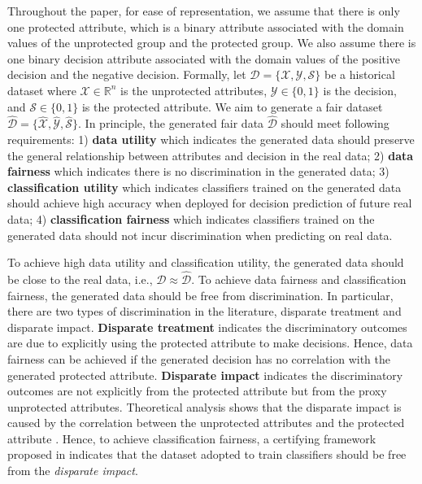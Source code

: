 \documentclass[sigconf]{acmart}
\theoremstyle{definition}
\begin{document}
Throughout the paper, for ease of representation, we assume that there is only one protected attribute,  which is a binary attribute associated with the domain values of the unprotected group  and the protected group. We also assume there is one binary decision attribute associated with the domain values of the positive decision and the negative decision. Formally, let $\mathcal{D} = \{\mathcal{X}, \mathcal{Y}, \mathcal{S}\}$ be a historical dataset where $\mathcal{X} \in \mathbb{R}^n$ is the unprotected attributes, $\mathcal{Y} \in \{0,1\}$ is the decision, and $\mathcal{S} \in \{0,1\}$ is the protected attribute. We aim to generate a fair dataset $\hat{\mathcal{D}} = \{\hat{\mathcal{X}}, \hat{\mathcal{Y}}, \hat{\mathcal{S}}\}$. In principle, the generated fair data $\hat{\mathcal{D}}$ should meet following requirements: 1) \textbf{data utility} which indicates the generated data should preserve the general relationship between attributes and decision in the real data; 2) \textbf{data fairness} which indicates there is no discrimination in the generated data; 3) \textbf{classification utility} which indicates classifiers trained on the generated data should achieve high accuracy when deployed for decision prediction of future real data; 4) \textbf{classification fairness} which indicates classifiers trained on the generated data should not incur discrimination when predicting on real data. 

To achieve high data utility and classification utility, the generated data should be close to the real data, i.e., $\mathcal{D} \approx \hat{\mathcal{D}}$. To achieve data fairness and classification fairness, the generated data should be free from discrimination. In particular, there are two types of discrimination in the literature, disparate treatment and disparate impact. 
\textbf{Disparate treatment} indicates the discriminatory outcomes are due to explicitly using the protected attribute to make decisions. Hence, data fairness can be achieved if the generated decision has no correlation with the generated protected attribute. 
\textbf{Disparate impact} indicates the discriminatory outcomes are not explicitly from the protected attribute but from the proxy unprotected attributes. Theoretical analysis shows that the disparate impact is caused by the correlation between the unprotected attributes and the protected attribute \cite{Feldman2015Certifying}. Hence, to achieve classification fairness, a certifying framework proposed in \cite{Feldman2015Certifying} indicates that the dataset adopted to train classifiers should be free from the \textit{disparate impact}. 
\end{document}
